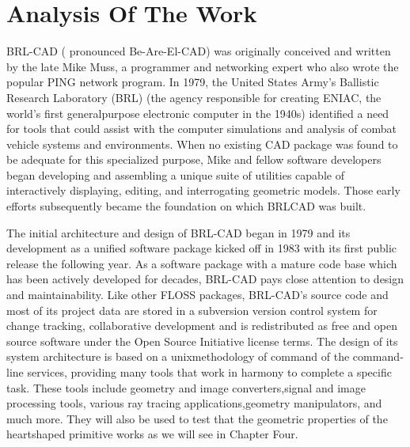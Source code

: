 
\section{Analysis Of The Work}

\hspace{30} BRL­-CAD   (   pronounced   Be­-Are-­El-­CAD)   was   originally   conceived   and  
written   by   the   late   Mike   Muss,   a   programmer   and   networking   expert   who   also  
wrote   the   popular   PING   network   program.   In   1979,   the   United   States   Army's  
Ballistic   Research   Laboratory   (BRL)   (the   agency   responsible   for   creating  
ENIAC,   the   world's   first   general­purpose   electronic   computer   in   the   1940s)  
identified   a   need   for   tools   that   could   assist   with   the   computer   simulations   and  
analysis   of   combat   vehicle   systems   and   environments.   When   no   existing   CAD  
package   was   found   to   be   adequate   for   this   specialized   purpose,   Mike   and  
fellow   software   developers   began   developing   and   assembling   a   unique   suite   of  
utilities   capable   of   interactively   displaying,   editing,   and   interrogating   geometric  
models.   Those   early   efforts   subsequently   became   the   foundation   on   which  
BRL­CAD was built.  

\hspace{30} The   initial   architecture   and   design   of   BRL-­CAD   began   in   1979   and   its  
development   as   a   unified   software   package   kicked   off   in   1983   with   its   first  
public   release   the   following   year.   As   a   software   package   with   a   mature   code  
base   which   has   been   actively   developed   for   decades,   BRL-­CAD   pays   close  
attention   to   design   and   maintainability.   Like   other   FLOSS   packages,  
BRL­-CAD's   source   code   and   most   of   its   project   data   are   stored   in   a  
subversion   version   control   system   for   change   tracking,   collaborative  
development   and   is   redistributed   as   free   and   open   source   software   under   the  
Open   Source   Initiative   license   terms.   The   design   of   its   system   architecture   is  
based   on   a   unix­methodology   of   command   of   the   command­line   services,  
providing   many   tools   that   work   in   harmony   to   complete   a   specific   task.   These  
tools   include   geometry   and   image   converters,signal   and   image   processing  
tools,   various   ray   tracing   applications,geometry   manipulators,   and   much   more.  
They   will   also   be   used   to   test   that   the   geometric   properties   of   the   heart­shaped  
primitive works as we will see in Chapter Four.

